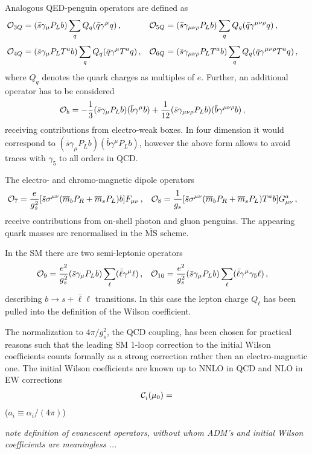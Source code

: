 Analogous QED-penguin operators are defined as 
\begin{equation}
\begin{aligned}
  \mathcal{O}_{3Q} & = (\bar{s} \gamma_\mu P_L b)     \sum_q Q_q (\bar{q} \gamma^\mu q) \,, & 
  \mathcal{O}_{5Q} & = (\bar{s} \gamma_{\mu\nu\rho} P_L b)
             \sum_q Q_q (\bar{q} \gamma^{\mu\nu\rho} q) \,, &
\\[1mm]   
  \mathcal{O}_{4Q} & = (\bar{s} \gamma_\mu P_L T^a b) \sum_q Q_q (\bar{q} \gamma^\mu T^a q) \,, &
  \mathcal{O}_{6Q} & = (\bar{s} \gamma_{\mu\nu\rho} P_L T^a b) 
             \sum_q Q_q (\bar{q} \gamma^{\mu\nu\rho} T^a q) \,,
\end{aligned}
\end{equation}
where $Q_q$ denotes the quark charges as multiples of $e$. Further, an additional
operator has to be considered
\begin{align}
  \mathcal{O}_{b} & = -\frac{1}{3}  (\bar{s} \gamma_\mu P_L b)(\bar{b} \gamma^\mu b)
             +\frac{1}{12} (\bar{s} \gamma_{\mu\nu\rho} P_L b)
                           (\bar{b} \gamma^{\mu\nu\rho} b) \,,
\end{align}
receiving contributions from electro-weak boxes. In four dimension it would
correspond to $(\bar{s} \gamma_\mu P_L b)(\bar{b} \gamma^\mu P_L b)$, however
the above form allows to avoid traces with $\gamma_5$ to all orders in QCD.

The electro- and chromo-magnetic dipole operators
\begin{align}
  \mathcal{O}_{7} & = \frac{e}{g_s^2} [\bar{s} \sigma^{\mu \nu} 
             (\overline{m}_b P_R + \overline{m}_s P_L) b] F_{\mu \nu} \,, &
  \mathcal{O}_{8} & = \frac{1}{g_s}   [\bar{s} \sigma^{\mu \nu}
             (\overline{m}_b P_R + \overline{m}_s P_L) T^a b] G_{\mu \nu}^a \,, &  
\end{align}
receive contributions from on-shell photon and gluon penguins. The appearing
quark masses are renormalised in the $\overline{\mbox{MS}}$ scheme. 

In the SM there are two semi-leptonic operators
\begin{align}
  \mathcal{O}_{9}  & = \frac{e^2}{g_s^2} (\bar{s} \gamma_\mu P_L b) 
              \sum_\ell (\bar{\ell} \gamma^\mu \ell) \,, &
  \mathcal{O}_{10} & = \frac{e^2}{g_s^2} (\bar{s} \gamma_\mu P_L b)
              \sum_\ell (\bar{\ell} \gamma^\mu \gamma_5 \ell) \,, &  
\end{align}
describing $b\to s + \bar\ell\ell$ transitions. In this case the lepton
charge $Q_\ell$ has been pulled into the definition of the Wilson
coefficient.

The normalization to $4\pi/g_s^2$, the QCD coupling, has been chosen for practical
reasons such that the leading SM 1-loop correction to the initial Wilson coefficients
counts formally as a strong correction rather then an electro-magnetic one. The 
initial Wilson coefficients are known up to NNLO in QCD and NLO in EW corrections
\begin{align}
  \mathcal{C}_{i}^{\mathrm{{}}}(\mu_0) = 
\end{align}
($a_i \equiv \alpha_i/(4\pi)$)

{\em note definition of evanescent operators, without whom ADM's and initial Wilson 
coefficients are meaningless ...} 


